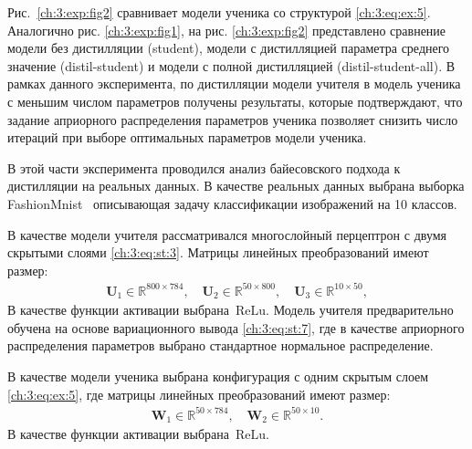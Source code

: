 Рис.~\ref{ch:3:exp:fig2} сравнивает модели ученика со структурой \eqref{ch:3:eq:ex:5}. Аналогично рис. \ref{ch:3:exp:fig1}, на рис. \ref{ch:3:exp:fig2} представлено сравнение модели без дистилляции (student), модели с дистилляцией параметра среднего значение (distil-student) и модели с полной дистилляцией (distil-student-all). В рамках данного эксперимента, по дистилляции модели учителя в модель ученика с меньшим числом параметров получены результаты, которые подтверждают, что задание априорного распределения параметров ученика позволяет снизить число итераций при выборе оптимальных параметров модели ученика.

В этой части эксперимента проводился анализ байесовского подхода к дистилляции на реальных данных.  В качестве реальных данных выбрана выборка FashionMnist~\cite{fashionmnist} описывающая задачу классификации изображений на 10 классов.

В качестве модели учителя рассматривался многослойный перцептрон с двумя скрытыми слоями \eqref{ch:3:eq:st:3}. Матрицы линейных преобразований имеют размер:
\[
\label{ch:3:eq:ex:7}
\begin{aligned}
\mathbf{U}_{1} \in \mathbb{R}^{800 \times 784}, \quad \mathbf{U}_{2} \in \mathbb{R}^{50 \times 800}, \quad \mathbf{U}_{3} \in \mathbb{R}^{10 \times 50},
\end{aligned}
\]
В качестве функции активации выбрана~$\text{ReLu}$.
Модель учителя предварительно обучена на основе вариационного вывода \eqref{ch:3:eq:st:7}, где в качестве априорного распределения параметров выбрано стандартное нормальное распределение.

В качестве модели ученика выбрана конфигурация с одним скрытым слоем \eqref{ch:3:eq:ex:5}, где матрицы линейных преобразований имеют размер:
\[
\label{ch:3:eq:ex:7}
\begin{aligned}
\mathbf{W}_{1} \in \mathbb{R}^{50 \times 784}, \quad \mathbf{W}_{2} \in \mathbb{R}^{50 \times 10}.
\end{aligned}
\]
В качестве функции активации выбрана~$\text{ReLu}$.

